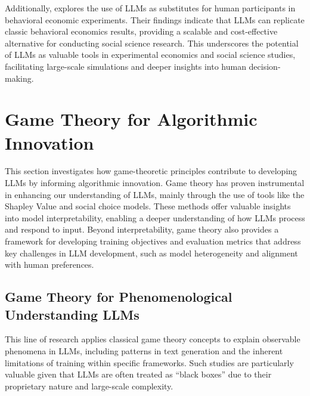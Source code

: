 Additionally, \cite{horton2023large} explores the use of LLMs as substitutes for human participants in behavioral economic experiments. Their findings indicate that LLMs can replicate classic behavioral economics results, providing a scalable and cost-effective alternative for conducting social science research. This underscores the potential of LLMs as valuable tools in experimental economics and social science studies, facilitating large-scale simulations and deeper insights into human decision-making.

\section{Game Theory for Algorithmic Innovation}\label{sec:game_for_llm}

This section investigates how game-theoretic principles contribute to developing LLMs by informing algorithmic innovation. 
Game theory has proven instrumental in enhancing our understanding of LLMs, mainly through the use of tools like the Shapley Value and social choice models. 
These methods offer valuable insights into model interpretability, enabling a deeper understanding of how LLMs process and respond to input. 
Beyond interpretability, game theory also provides a framework for developing training objectives and evaluation metrics that address key challenges in LLM development, such as model heterogeneity and alignment with human preferences.

\subsection{Game Theory for Phenomenological Understanding LLMs}\label{sec:game_for_llm_understanding}

This line of research applies classical game theory concepts to explain observable phenomena in LLMs, including patterns in text generation and the inherent limitations of training within specific frameworks.
Such studies are particularly valuable given that LLMs are often treated as ``black boxes'' due to their proprietary nature and large-scale complexity.

